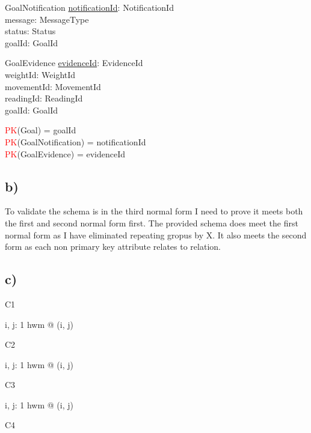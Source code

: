 \documentclass{article}
\begin{document}
\begin{schema}{GoalNotification}
	\underline{notificationId}: NotificationId \\
    message: MessageType \\
    status: Status \\
    goalId: GoalId \\
\end{schema}

\begin{schema}{GoalEvidence}
	\underline{evidenceId}: EvidenceId \\
    weightId: WeightId \\
    movementId: MovementId \\
    readingId: ReadingId \\ 
    goalId: GoalId \\
\end{schema}

\begin{zed}
\textcolor{red}{PK}(Goal) = { goalId }  \\
\textcolor{red}{PK}(GoalNotification) = { notificationId }  \\
\textcolor{red}{PK}(GoalEvidence) = { evidenceId }  \\
\end{zed}

\pagebreak 

\subsection*{\small b)}

To validate the schema is in the third normal form I need to prove it meets both the first and second normal form first.
\newline
\newline
The provided schema does meet the first normal form as I have eliminated repeating gropus by X.
\newline
\newline
It also meets the second form as each non primary key attribute relates to relation.

\subsection*{\small c)}

C1
\begin{zed}
\forall i, j: 1 \upto hwm @ (i, j)
\end{zed}
C2
\begin{zed}
\forall i, j: 1 \upto hwm @ (i, j)
\end{zed}
C3
\begin{zed}
\forall i, j: 1 \upto hwm @ (i, j) 
\end{zed}
C4
\end{document}
